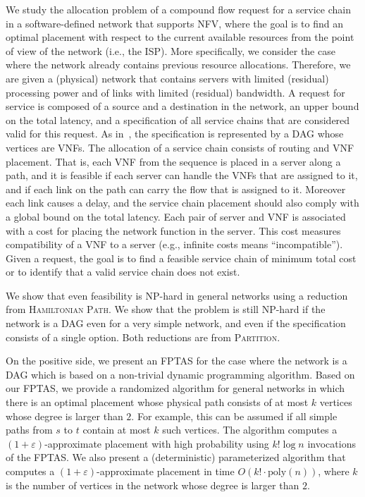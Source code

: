 \documentclass[runningheads]{llncs}
\newcommand{\eps}{\varepsilon}
\begin{document}
We study the allocation problem of a compound flow request for a
service chain in a software-defined network that supports NFV, where
the goal is to find an optimal placement with respect to the current
available resources from the point of view of the network (i.e., the
ISP).
%
More specifically, we consider the case where the network already
contains previous resource allocations.  Therefore, we are given a
(physical) network that contains servers with limited (residual)
processing power and of links with limited (residual) bandwidth.
%
A request for service is composed of a source and a destination in the
network, an upper bound on the total latency, and a specification of
all service chains that are considered valid for this request.  As
in~\cite{EMP16}, the specification is represented by a DAG whose
vertices are VNFs.
%
The allocation of a service chain consists of routing and VNF
placement.  That is, each VNF from the sequence is placed in a server
along a path, and it is feasible if each server can handle the VNFs
that are assigned to it, and if each link on the path can carry the
flow that is assigned to it.  Moreover each link causes a delay, and
the service chain placement should also comply with a global bound on
the total latency.
%
Each pair of server and VNF is associated with a cost for placing the
network function in the server.  This cost measures compatibility of a
VNF to a server (e.g., infinite costs means ``incompatible'').  Given
a request, the goal is to find a feasible service chain of minimum
total cost or to identify that a valid service chain does not exist.

We show that even feasibility is NP-hard in general networks using a
reduction from \textsc{Hamiltonian Path}.
We show that the problem is still NP-hard if the network is a DAG even
for a very simple network, and even if the specification consists of a
single option.  Both reductions are from \textsc{Partition}.

On the positive side, we present an FPTAS for the case where the
network is a DAG which is based on a non-trivial dynamic programming
algorithm.
%
Based on our FPTAS, we provide a randomized algorithm for general
networks in which there is an optimal placement whose physical path
consists of at most $k$ vertices whose degree is larger than $2$.  For
example, this can be assumed if all simple paths from $s$ to $t$
contain at most $k$ such vertices.  The algorithm computes a
$(1+\eps)$-approximate placement with high probability using $k! \log
n$ invocations of the FPTAS.
%
We also present a (deterministic) parameterized algorithm that
computes a $(1+\eps)$-approximate placement in time $O(k! \cdot
\text{poly}(n))$, where $k$ is the number of vertices in the network
whose degree is larger than $2$.
\end{document}

